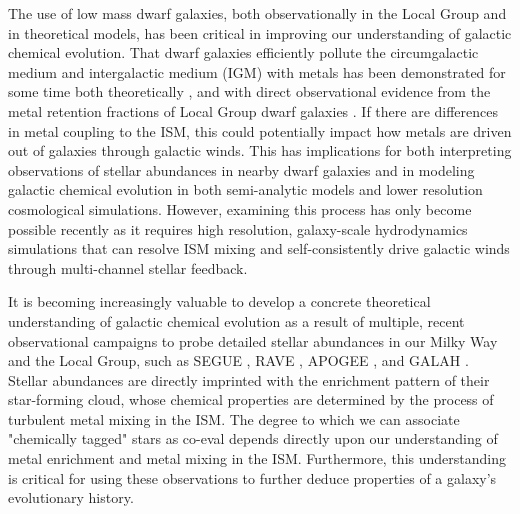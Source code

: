 The use of low mass dwarf galaxies, both observationally in the Local Group and in theoretical models, has been critical in improving our understanding of galactic chemical evolution. That dwarf galaxies efficiently pollute the circumgalactic medium and intergalactic medium (IGM) with metals has been demonstrated for some time both theoretically \citep[e.g.][]{DekelSilk1986,MacLowFerrara1999,Fragile2004,Muratov2017,Corlies2018}, and with direct observational evidence from the metal retention fractions of Local Group dwarf galaxies \citep[e.g.][]{Kirby2011-metals,Bordoloi2014,McQuinn2015}. If there are differences in metal coupling to the ISM, this could potentially impact how metals are driven out of galaxies through galactic winds. This has implications for both interpreting observations of stellar abundances in nearby dwarf galaxies and in modeling galactic chemical evolution in both semi-analytic models and lower resolution cosmological simulations. However, examining this process has only become possible recently as it requires high resolution, galaxy-scale hydrodynamics simulations that can resolve ISM mixing and self-consistently drive galactic winds through multi-channel stellar feedback.

It is becoming increasingly valuable to develop a concrete theoretical understanding of galactic chemical evolution as a result of multiple, recent observational campaigns to probe detailed stellar abundances in our Milky Way and the Local Group, such as SEGUE \citep{Yanny2009}, RAVE \citep{Kunder2017}, APOGEE \citep{Anders2014}, and GALAH \citep{Buder2018}. Stellar abundances are directly imprinted with the enrichment pattern of their star-forming cloud, whose chemical properties are determined by the process of turbulent metal mixing in the ISM. The degree to which we can associate "chemically tagged" stars as co-eval depends directly upon our understanding of metal enrichment and metal mixing in the ISM. Furthermore, this understanding is critical for using these observations to further deduce properties of a galaxy's evolutionary history. 

